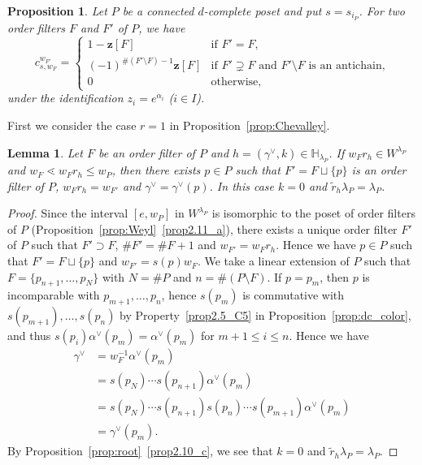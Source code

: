\documentclass[10pt]{amsart}
\newtheorem{prop}[theo]{Proposition}
\newtheorem{lemm}[theo]{Lemma}
\theoremstyle{definition}
\theoremstyle{remark}
\newcommand\vectz{\boldsymbol{z}}
\renewcommand\tilde{\widetilde}
\begin{document}
\begin{prop}
\label{prop:Chevalley_P}
Let $P$ be a connected $d$-complete poset and put $s = s_{i_P}$.
For two order filters $F$ and $F'$ of $P$, we have
\begin{equation}
\label{eq:Chevalley_P}
c^{w_{F'}}_{s,w_F}
 =
\begin{cases}
 1 - \vectz[F]
 &\text{if $F' = F$,}
\\
 (-1)^{\# (F' \setminus F) -1} \vectz[F]
 &\text{if $F' \supsetneq F$ and $F' \setminus F$ is an antichain,}
\\
 0
 &\text{otherwise,}
\end{cases}
\end{equation}
under the identification $z_i = e^{\alpha_i}$ \textup{(}$i \in I$\textup{)}.
\end{prop}

First we consider the case $r=1$ in Proposition~\ref{prop:Chevalley}.

\begin{lemm}
\label{lem:r=1}
Let $F$ be an order filter of $P$ and $h = (\gamma^\vee,k) \in \mathbb{H}_{\lambda_P}$.
If $w_F r_h \in W^{\lambda_P}$ and $w_F \lessdot w_F r_h \le w_P$, 
then there exists $p \in P$ such that $F' = F \sqcup \{ p \}$ is an order filter of $P$, 
$w_F r_h = w_{F'}$ and $\gamma^\vee = \gamma^\vee(p)$.
In this case $k=0$ and $\tilde{r}_h \lambda_P = \lambda_P$.
\end{lemm}

\begin{proof}
Since the interval $[e, w_P]$ in $W^{\lambda_P}$ is isomorphic to the poset of order filters of $P$ 
(Proposition~\ref{prop:Weyl}~\ref{prop2.11_a}), 
there exists a unique order filter $F'$ of $P$ such that $F' \supset F$, 
$\# F' = \# F + 1$ and $w_{F'} = w_F r_h$.
Hence we have $p \in P$ such that $F' = F \sqcup \{ p \}$ and $w_{F'} = s(p) w_F$.
We take a linear extension of $P$ such that $F = \{ p_{n+1}, \ldots, p_N \}$ 
with $N = \# P$ and $n = \# (P \setminus F)$.
If $p = p_m$, then $p$ is incomparable with $p_{m+1}, \ldots, p_n$, 
hence $s(p_m)$ is commutative with $s(p_{m+1}), \ldots, s(p_n)$ by Property~\ref{prop2.5_C5}
in Proposition~\ref{prop:dc_color}, 
and thus $s(p_i)\alpha^\vee(p_m)=\alpha^\vee(p_m)$ for $m+1 \le i \le n$.
Hence we have
\begin{align*}
\gamma^\vee
 &= 
w_F^{-1} \alpha^\vee(p_m)
\\
 &=
s(p_N) \cdots s(p_{n+1}) \alpha^\vee(p_m)
\\
 &=
s(p_N) \cdots s(p_{n+1}) s(p_n) \cdots s(p_{m+1}) \alpha^\vee(p_m)
\\
 &=
\gamma^\vee(p_m).
\end{align*}
By Proposition~\ref{prop:root}~\ref{prop2.10_c}, we see that $k=0$ and $\tilde{r}_h \lambda_P = \lambda_P$.
\end{proof}
\end{document}
